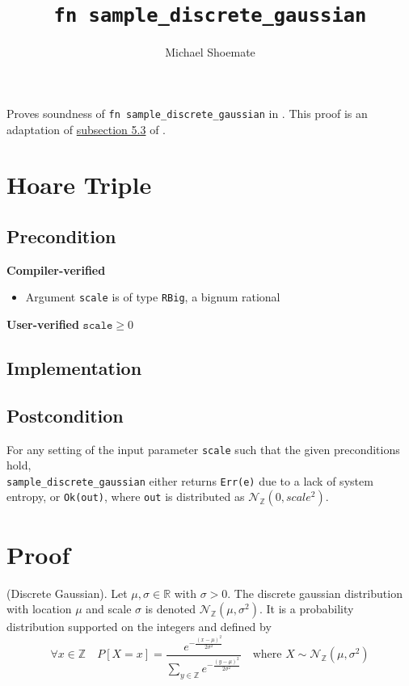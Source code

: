 \documentclass{article}
\title{\texttt{fn sample\_discrete\_gaussian}}
\author{Michael Shoemate}
\begin{document}
 
\maketitle 
 
Proves soundness of \texttt{fn sample\_discrete\_gaussian} in . 
This proof is an adaptation of \href{https://arxiv.org/pdf/2004.00010.pdf#subsection.5.3}{subsection 5.3} of \cite{CKS20}. 
 
\section{Hoare Triple} 
\subsection*{Precondition} 
\textbf{Compiler-verified} 
\begin{itemize} 
    \item Argument \texttt{scale} is of type \texttt{RBig}, a bignum rational 
\end{itemize} 
 
\textbf{User-verified} 
$\texttt{scale} \geq 0$ 
 
\subsection*{Implementation} 
 
 
\subsection*{Postcondition} 
\label{postcondition} 
For any setting of the input parameter \texttt{scale} such that the given preconditions hold, \\ 
\texttt{sample\_discrete\_gaussian} either returns \texttt{Err(e)} due to a lack of system entropy, 
or \texttt{Ok(out)}, where \texttt{out} is distributed as $\mathcal{N}_\mathbb{Z}(0, scale^2)$. 
 
\section{Proof} 
 
\begin{definition} 
    (Discrete Gaussian). \cite{CKS20} Let $\mu, \sigma \in \mathbb{R}$ with $\sigma > 0$.  
    The discrete gaussian distribution with location $\mu$ and scale $\sigma$ is denoted $\mathcal{N}_\mathbb{Z}(\mu, \sigma^2)$.  
    It is a probability distribution supported on the integers and defined by 
    \begin{equation*} 
        \forall x \in \mathbb{Z} \quad  P[X = x] = \frac{e^{-\frac{(x - \mu)^2}{2\sigma^2}}}{\sum_{y\in\mathbb{Z}}e^{-\frac{(y - \mu)^2}{2\sigma^2}}} \quad \text{where } X \sim \mathcal{N}_\mathbb{Z}(\mu, \sigma^2) 
    \end{equation*} 
\end{definition} 
 
\end{document}
